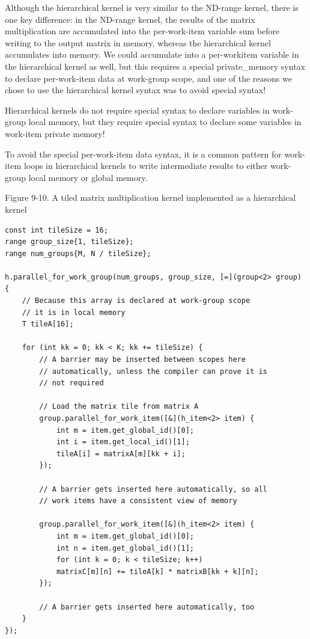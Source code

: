 Although the hierarchical kernel is very similar to the ND-range kernel, there is one key difference: in the ND-range kernel, the results of the matrix multiplication are accumulated into the per-work-item variable sum before writing to the output matrix in memory, whereas the hierarchical kernel accumulates into memory. We could accumulate into a per-workitem variable in the hierarchical kernel as well, but this requires a special private\_memory syntax to declare per-work-item data at work-group scope, and one of the reasons we chose to use the hierarchical kernel syntax was to avoid special syntax!\par

\begin{tcolorbox}[colback=red!5!white,colframe=red!75!black]
Hierarchical kernels do not require special syntax to declare variables in work-group local memory, but they require special syntax to declare some variables in work-item private memory!
\end{tcolorbox}

To avoid the special per-work-item data syntax, it is a common pattern for work-item loops in hierarchical kernels to write intermediate results to either work-group local memory or global memory.\par

\hspace*{\fill} \par %
Figure 9-10. A tiled matrix multiplication kernel implemented as a hierarchical kernel
\begin{lstlisting}[caption={}]
const int tileSize = 16;
range group_size{1, tileSize};
range num_groups{M, N / tileSize};

h.parallel_for_work_group(num_groups, group_size, [=](group<2> group) {
	// Because this array is declared at work-group scope
	// it is in local memory
	T tileA[16];
	
	for (int kk = 0; kk < K; kk += tileSize) {
		// A barrier may be inserted between scopes here
		// automatically, unless the compiler can prove it is
		// not required
		
		// Load the matrix tile from matrix A
		group.parallel_for_work_item([&](h_item<2> item) {
			int m = item.get_global_id()[0];
			int i = item.get_local_id()[1];
			tileA[i] = matrixA[m][kk + i];
		});
	
		// A barrier gets inserted here automatically, so all
		// work items have a consistent view of memory
		
		group.parallel_for_work_item([&](h_item<2> item) {
			int m = item.get_global_id()[0];
			int n = item.get_global_id()[1];
			for (int k = 0; k < tileSize; k++)
			matrixC[m][n] += tileA[k] * matrixB[kk + k][n];
		});
	
		// A barrier gets inserted here automatically, too
	}
});
\end{lstlisting}

